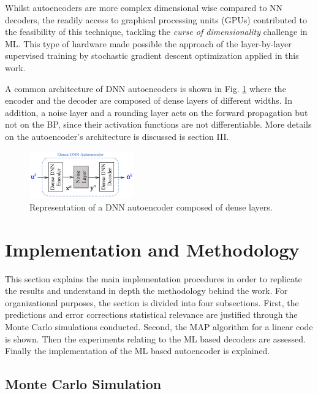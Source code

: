 \documentclass[conference]{IEEEtran}
\begin{document}
Whilst autoencoders are more complex dimensional wise compared to NN decoders, the readily access to graphical processing units (GPUs) contributed to the feasibility of this technique, tackling the \textit{curse of dimensionality} challenge in ML. This type of hardware made possible the approach of the layer-by-layer supervised training by stochastic gradient descent optimization applied in this work. \cite{doi:10.1162/neco.2006.18.7.1527}

A common architecture of DNN autoencoders is shown in Fig. \ref{fig:DDNNAutoencoder} where the encoder and the decoder are composed of dense layers of different widths. In addition, a noise layer and a rounding layer acts on the forward propagation but not on the BP, since their activation functions are not differentiable. More details on the autoencoder's architecture is discussed is section III.  


\begin{figure}[!ht]
  \centering
    \includegraphics[width=0.4\textwidth]{images/DNN_autoencoder}
    \caption{Representation of a DNN autoencoder composed of dense layers.}\label{fig:DDNNAutoencoder}
\end{figure}



\section{Implementation and Methodology}
This section explains the main implementation procedures in order to replicate the results and understand in depth the methodology behind the work. For organizational purposes, the section is divided into four subsections. First, the predictions and error corrections statistical relevance are justified through the Monte Carlo simulations conducted. Second, the MAP algorithm for a linear code is shown. Then the experiments relating to the ML based decoders are assessed. Finally the implementation of the ML based autoencoder is explained. 

\subsection{Monte Carlo Simulation}
\end{document}
